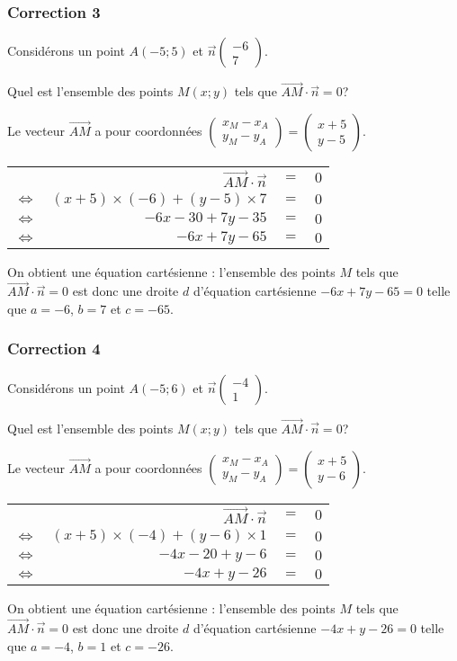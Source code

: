\documentclass[15pt, mathserif]{beamer}
\newenvironment{Eq}{\begin{center}\begin{tabular}{rrcl}}{\end{tabular}\end{center}}
\newcommand{\ligneq}[2]{$\Longleftrightarrow$ & $#1$ & $=$ & $#2$ \\}
\newcommand{\Ligneq}[2]{ & $#1$ & $=$ & $#2$ \\}
\begin{document}
\begin{frame}
\vspace{-10mm}
	\frametitle{Correction 3}
\vspace{0.5cm} 
 Considérons un point $A(-5;5)$ et $\vec{n} \begin{pmatrix}
  -6\\ 
 7 
 \end{pmatrix}$. 
 
 Quel est l'ensemble des points $M(x;y)$ tels que $\overrightarrow{AM} \cdot \vec{n}=0$?
 
 Le vecteur $\overrightarrow{AM}$ a pour coordonnées $\begin{pmatrix} 
 x_M-x_A \\ 
  y_M-y_A 
 \end{pmatrix}=\begin{pmatrix} x+5 \\ 
 y -5 
 \end{pmatrix}$. 
 
 \begin{Eq} 
 \Ligneq{\overrightarrow{AM} \cdot \vec{n}}{0} 
 \ligneq{(x+5) \times \left(-6\right) + (y-5) \times7}{0} 
 \ligneq{-6x-30+7y-35}{0} 
 \ligneq{-6x+7y-65}{0} 
 \end{Eq} 
 
 On obtient une équation cartésienne : l'ensemble des points $M$ tels que $\overrightarrow{AM}\cdot \vec{n}=0$ est donc une droite $d$ d'équation cartésienne $-6x+7y-65=0$ telle que $a=-6$, $b=7$ et $c=-65$. \end{frame}


\begin{frame}
\vspace{-10mm}
	\frametitle{Correction 4}
\vspace{0.5cm} 
 Considérons un point $A(-5;6)$ et $\vec{n} \begin{pmatrix}
  -4\\ 
 1 
 \end{pmatrix}$. 
 
 Quel est l'ensemble des points $M(x;y)$ tels que $\overrightarrow{AM} \cdot \vec{n}=0$?
 
 Le vecteur $\overrightarrow{AM}$ a pour coordonnées $\begin{pmatrix} 
 x_M-x_A \\ 
  y_M-y_A 
 \end{pmatrix}=\begin{pmatrix} x+5 \\ 
 y -6 
 \end{pmatrix}$. 
 
 \begin{Eq} 
 \Ligneq{\overrightarrow{AM} \cdot \vec{n}}{0} 
 \ligneq{(x+5) \times \left(-4\right) + (y-6) \times1}{0} 
 \ligneq{-4x-20+y-6}{0} 
 \ligneq{-4x+y-26}{0} 
 \end{Eq} 
 
 On obtient une équation cartésienne : l'ensemble des points $M$ tels que $\overrightarrow{AM}\cdot \vec{n}=0$ est donc une droite $d$ d'équation cartésienne $-4x+y-26=0$ telle que $a=-4$, $b=1$ et $c=-26$. \end{frame}
\end{document}
